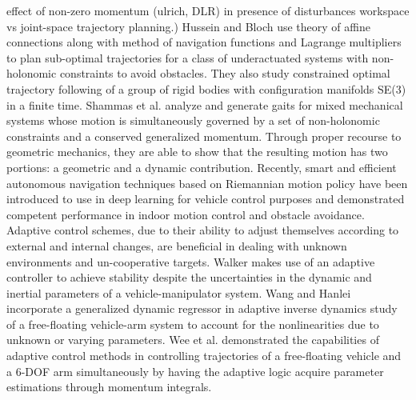 \documentclass[lettersize,journal]{IEEEtran}
\begin{document}
effect of non-zero momentum (ulrich, DLR) in presence of disturbances
workspace vs joint-space trajectory planning.)
Hussein and Bloch use theory of affine connections along with method of navigation functions and Lagrange multipliers to plan sub-optimal trajectories for a class of underactuated systems with non-holonomic constraints to avoid obstacles\cite{Hussein2008}. They also study constrained optimal trajectory following of a group of rigid bodies with configuration manifolds SE(3) in a finite time\cite{hussein2005constrained}{}. Shammas et al. analyze and generate gaits for mixed mechanical systems whose motion is simultaneously governed by a set of non-holonomic constraints and a conserved generalized momentum. Through proper recourse to geometric mechanics, they are able to show that the resulting motion has two portions: a geometric and a dynamic contribution\cite{pathshammas,pathshammas1}. 
Recently, smart and efficient autonomous navigation techniques based on Riemannian motion policy have been introduced to use in deep learning for vehicle control purposes\cite{Mengnavigation} and demonstrated competent performance in indoor motion control and obstacle avoidance. Adaptive control schemes, due to their ability to adjust themselves according to external and internal changes, are beneficial in dealing with unknown environments and un-cooperative targets. Walker makes use of an adaptive controller to achieve stability despite the uncertainties in the dynamic and inertial parameters of a vehicle-manipulator system\cite{Walker1991}. Wang and Hanlei incorporate a generalized dynamic regressor in adaptive inverse dynamics study of a free-floating vehicle-arm system to account for the nonlinearities due to unknown or varying parameters\cite{Wang2011}. 
Wee et al. demonstrated the capabilities of adaptive control methods in controlling trajectories of a free-floating vehicle and a 6-DOF arm simultaneously by having the adaptive logic acquire parameter estimations through momentum integrals\cite{Wee1997}. %
\end{document}
